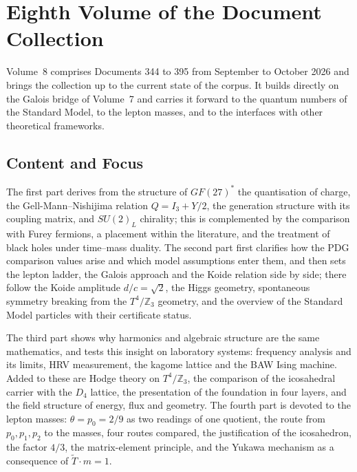 
\section*{Eighth Volume of the Document Collection}

Volume~8 comprises Documents 344 to 395 from September to October 2026
and brings the collection up to the current state of the corpus. It builds
directly on the Galois bridge of Volume~7 and carries it forward to the
quantum numbers of the Standard Model, to the lepton masses, and to the
interfaces with other theoretical frameworks.

\subsection*{Content and Focus}

The first part derives from the structure of $GF(27)^*$ the quantisation of
charge, the Gell-Mann--Nishijima relation $Q=I_3+Y/2$, the generation
structure with its coupling matrix, and $SU(2)_L$ chirality; this is
complemented by the comparison with Furey fermions, a placement within the
literature, and the treatment of black holes under time--mass duality. The
second part first clarifies how the PDG comparison values arise and which
model assumptions enter them, and then sets the lepton ladder, the Galois
approach and the Koide relation side by side; there follow the Koide
amplitude $d/c=\sqrt2$, the Higgs geometry, spontaneous symmetry breaking from
the $T^4/\mathbb{Z}_3$ geometry, and the overview of the Standard Model
particles with their certificate status.

The third part shows why harmonics and algebraic structure are the same
mathematics, and tests this insight on laboratory systems: frequency analysis
and its limits, HRV measurement, the kagome lattice and the BAW Ising machine.
Added to these are Hodge theory on $T^4/\mathbb{Z}_3$, the comparison of the
icosahedral carrier with the $D_4$ lattice, the presentation of the foundation
in four layers, and the field structure of energy, flux and geometry. The
fourth part is devoted to the lepton masses: $\theta=p_0=2/9$ as two readings
of one quotient, the route from $p_0,p_1,p_2$ to the masses, four routes
compared, the justification of the icosahedron, the factor $4/3$, the
matrix-element principle, and the Yukawa mechanism as a consequence of
$\tilde T\cdot m=1$.

